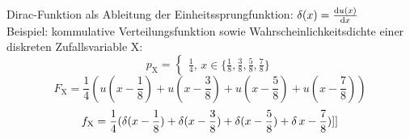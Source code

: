 \documentclass[german]{latex4ei/latex4ei_sheet}
\begin{document}
	Dirac-Funktion als Ableitung der Einheitssprungfunktion: $\operatorname{\delta} (x)=\frac{\mathrm{d} u(x)}{\mathrm{d} x}$\\
	Beispiel: kommulative Verteilungsfunktion sowie Wahrscheinlichkeitsdichte einer diskreten Zufallsvariable X:\\
	\[p_{\mathrm{X}}=\begin{cases} \frac{1}{4} , \, x \in \{\frac{1}{8},\frac{3}{8},\frac{5}{8},\frac{7}{8}\} \end{cases}\]
	\[F_{\mathrm{X}}=\frac{1}{4}(u(x-\frac{1}{8})+u(x-\frac{3}{8})+u(x-\frac{5}{8})+u(x-\frac{7}{8}))\]
	\[f_{\mathrm{X}}=\frac{1}{4}(\operatorname{\delta}(x-\frac{1}{8})+\operatorname{\delta}(x-\frac{3}{8})+\operatorname{\delta}(x-\frac{5}{8})+\operatorname{\delta}{x-\frac{7}{8}})]]\]
\end{document}
